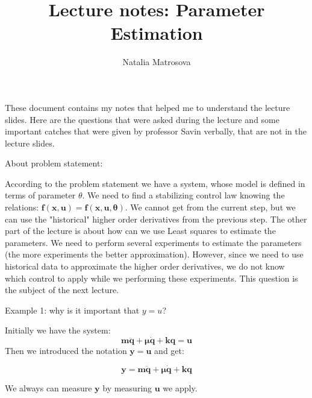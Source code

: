 \documentclass[12pt]{article}
\author{Natalia Matrosova}
\title{Lecture notes: Parameter Estimation}
\begin{document}
\maketitle

\large %



\begin{flushleft}

{\Large These document contains my notes that helped me to understand the lecture slides. Here are the questions that were asked during the lecture and some important catches that were given by professor Savin verbally, that are not in the lecture slides. } 
\end{flushleft}

\vspace{0.05in}


\begin{center}
    About problem statement:
\end{center}

\begin{flushleft}
According to the problem statement we have a system, whose model is defined in terms of parameter $\theta$.
We need to find a stabilizing control law knowing the relations: $\bm{f(x, u) = f(x, u, \theta)}$.
\bigskip
We cannot get from the current step, but we can use the "historical" higher order derivatives from the previous step. The other part of the lecture is about how can we use Least squares to estimate the parameters.
\bigskip
We need to perform several experiments to estimate the parameters (the more experiments the better approximation). However, since we need to use historical data to approximate the higher order derivatives, we do not know which control to apply while we performing these experiments. This question is the subject of the next lecture.
\end{flushleft}

\begin{center}
    Example 1: why is it important that $y = u$?
\end{center}
\begin{flushleft}
Initially we have the system:
\[
\bm{m \ddot{q} + \mu \dot{q} + kq = u}
\]
Then we introduced the notation $\bm{y = u}$ and get:

\[
\bm{y = m \ddot{q} + \mu \dot{q} + kq}
\]

We always can measure $\bm{y}$ by measuring $\bm{u}$ we apply.

\end{flushleft}
\end{document}
